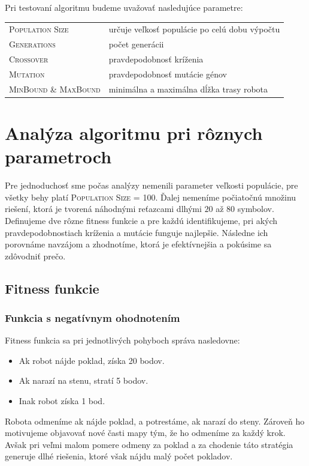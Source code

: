\documentclass[10pt]{paper}
\begin{document}
Pri testovaní algoritmu budeme uvažovať nasledujúce parametre:

\begin{tabular}{ll}
\hline
\textsc{Population Size} & určuje veľkosť populácie po celú dobu výpočtu \\ 
\textsc{Generations} & počet generácii \\
\textsc{Crossover}  & pravdepodobnosť kríženia  \\
\textsc{Mutation}  &  pravdepodobnosť mutácie génov  \\
\textsc{MinBound \& MaxBound}  &  minimálna a maximálna dĺžka trasy robota \\ \hline
\end{tabular}

\section{Analýza algoritmu pri rôznych parametroch}

Pre jednoduchosť sme počas analýzy nemenili parameter veľkosti populácie, pre všetky behy platí \textsc{Population Size} = 100. Ďalej nemeníme počiatočnú množinu riešení, ktorá je tvorená náhodnými reťazcami dlhými $20$ až $80$ symbolov. Definujeme dve rôzne fitness funkcie a pre každú identifikujeme, pri akých pravdepodobnostiach kríženia a mutácie funguje najlepšie. Následne ich porovnáme navzájom a zhodnotíme, ktorá je efektívnejšia a pokúsime sa zdôvodniť prečo.

\subsection{Fitness funkcie}
\subsubsection{Funkcia s negatívnym ohodnotením}
Fitness funkcia sa pri jednotlivých pohyboch správa nasledovne:
\begin{itemize}[noitemsep]
\item Ak robot nájde poklad, získa 20 bodov.
\item Ak narazí na stenu, stratí 5 bodov.
\item Inak robot získa 1 bod.
\end{itemize}
Robota odmeníme ak nájde poklad, a potrestáme, ak narazí do steny. Zároveň ho motivujeme objavovať nové časti mapy tým, že ho odmeníme za každý krok. Avšak pri veľmi malom pomere odmeny za poklad a za chodenie táto stratégia generuje dlhé riešenia, ktoré však nájdu malý počet pokladov.
\end{document}
